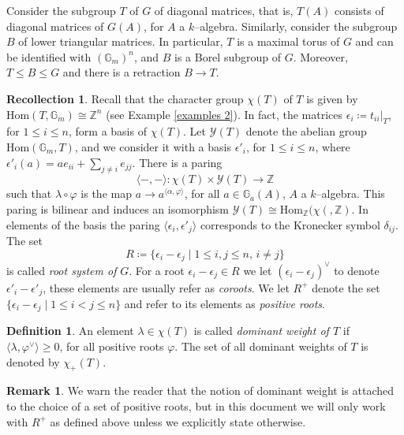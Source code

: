 \documentclass{article}
\theoremstyle{plain}
\theoremstyle{definition}
\newtheorem{Def}[Th]{Definition}
\newtheorem{Rem}[Th]{Remark}
\newtheorem{Rec}[Th]{Recollection}
\begin{document}
Consider the subgroup $T$ of $G$ of diagonal matrices, that is, $T(A)$ consists of diagonal matrices of $G(A)$, for $A$ a $k$--algebra. Similarly, consider the subgroup $B$ of lower triangular matrices. In particular, $T$ is a maximal torus of $G$ and can be identified with $(\mathbb{G}_m)^n$, and $B$ is a Borel subgroup of $G$. Moreover, $T\leq B\leq G$ and there is a retraction $B\to T$. 

\begin{Rec}
Recall that the character group $\chi(T)$ of $T$ is given by $\mathrm{Hom}(T,\mathbb{G}_m)\cong \mathbb{Z}^n$ (see Example \ref{examples 2}). In fact, the matrices $\epsilon_i\coloneq t_{ii}|_T$, for $1\leq i\leq n$, form a basis of $\chi(T)$. Let $\mathcal{Y}(T)$ denote the abelian group $\mathrm{Hom}(\mathbb{G}_m,T)$, and we consider it with a basis $\epsilon'_i$, for $1\leq i\leq n$, where $\epsilon'_i(a)= ae_{ii}+\sum_{j\not=i}e_{jj}$. There is a paring 
\[
\langle-,-\rangle\colon \chi(T)\times \mathcal{Y}(T)\to \mathbb{Z}
\]
such that $\lambda\circ \varphi$ is the map $a\to a^{\langle\alpha,\varphi\rangle}$, for all $a\in \mathbb{G}_a(A)$, $A$ a $k$--algebra. This paring is bilinear and induces an isomorphism $\mathcal{Y}(T)\cong\mathrm{Hom}_\mathbb{Z}(\chi(,\mathbb{Z})$. In elements of the basis the paring $\langle \epsilon_i,\epsilon'_j\rangle$ corresponds to the Kronecker symbol $\delta_{ij}$. The set 
\[
R\coloneq \{\epsilon_i-\epsilon_j\mid 1\leq i,j\leq n, \, i\not= j\}
\]
is called \textit{root system of} $G$. 
For a root $\epsilon_i-\epsilon_j\in R$ we let $(\epsilon_i-\epsilon_j)^\vee$ to denote $\epsilon'_i-\epsilon'_j$, these elements are usually refer as \textit{coroots}.   We let $R^+$ denote the set $\{\epsilon_i-\epsilon_j\mid 1\leq i<j\leq n\}$ and refer to its elements as \textit{positive roots}. 
\end{Rec}

   

 

\begin{Def}
 An element $\lambda \in \chi(T)$ is called \textit{dominant weight of $T$} if  $\langle \lambda, \varphi^\vee\rangle\geq 0$, for all positive roots $\varphi$. The set of all dominant weights of $T$ is denoted by $\chi_+(T)$. 
\end{Def}

\begin{Rem}
We warn the reader that the notion of dominant weight is attached to the choice of a set of positive roots, but in this document we will only work with $R^+$ as defined above unless we explicitly state otherwise. 
    
\end{Rem}
\end{document}
